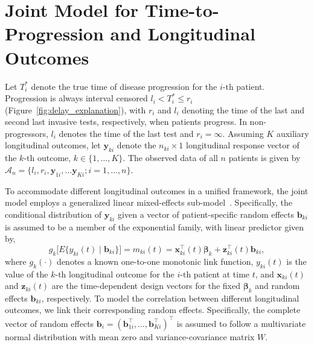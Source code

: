 \section{Joint Model for Time-to-Progression and Longitudinal Outcomes}
\label{sec:jointmodel}
Let $T_i^*$ denote the true time of disease progression for the ${i\mbox{-th}}$ patient. Progression is always interval censored ${l_i < T_i^* \leq r_i}$ (Figure~\ref{fig:delay_explanation}), with $r_i$ and $l_i$ denoting the time of the last and second last invasive tests, respectively, when patients progress. In non-progressors, $l_i$ denotes the time of the last test and ${r_i=\infty}$. Assuming $K$ auxiliary longitudinal outcomes, let $\boldsymbol{y}_{ki}$ denote the ${n_{ki} \times 1}$ longitudinal response vector of the ${k\mbox{-th}}$ outcome, $k \in \{1, \ldots, K\}$. The observed data of all $n$ patients is given by ${\mathcal{A}_n = \{l_i, r_i, \boldsymbol{y}_{1i},\ldots \boldsymbol{y}_{Ki}; i = 1, \ldots, n\}}$.

To accommodate different longitudinal outcomes in a unified framework, the joint model employs a generalized linear mixed-effects sub-model~\citep{mcculloch2005generalized}. Specifically, the conditional distribution of $\boldsymbol{y}_{ki}$ given a vector of patient-specific random effects $\boldsymbol{b}_{ki}$ is assumed to be a member of the exponential family, with linear predictor given by,
\begin{equation*}
\label{eq:long_model}
g_k\big[E\{y_{ki} (t) \mid \boldsymbol{b}_{ki}\}\big] = m_{ki}(t) = \boldsymbol{x}_{ki}^{\top}(t)\boldsymbol{\beta}_{k} + \boldsymbol{z}_{ki}^{\top}(t)\boldsymbol{b}_{ki},
\end{equation*}
where $g_k(\cdot)$ denotes a known one-to-one monotonic link function, $y_{ki}(t)$ is the
value of the ${k\mbox{-th}}$ longitudinal outcome for the ${i\mbox{-th}}$ patient at time $t$, and $\boldsymbol{x}_{ki}(t)$ and $\boldsymbol{z}_{ki}(t)$ are the time-dependent design vectors for the fixed $\boldsymbol{\beta}_{k}$ and random effects $\boldsymbol{b}_{ki}$, respectively. To model the correlation between different longitudinal outcomes, we link their corresponding random effects. Specifically, the complete vector of random effects ${\boldsymbol{b}_{i} = (\boldsymbol{b}_{1i}^{\top}, \ldots, \boldsymbol{b}_{Ki}^{\top})^{\top}}$ is assumed to follow a multivariate normal distribution with mean zero and variance-covariance matrix $W$.

